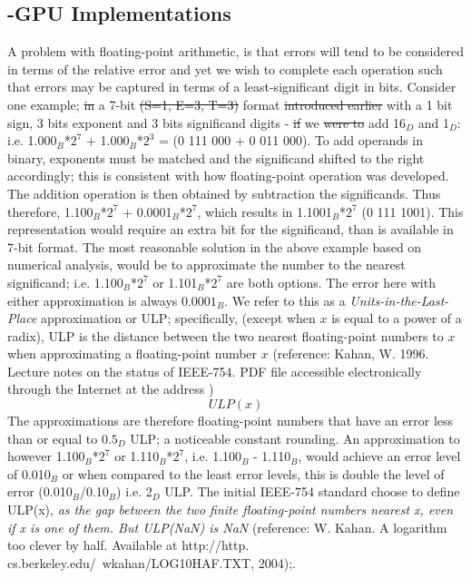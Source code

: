 \documentclass[7pt]{article}
\begin{document}
\subsection*{-GPU Implementations}
A problem with floating-point arithmetic, is that errors will tend to be considered in terms of the relative error and yet we wish to complete each operation such that errors may be captured in terms of a least-significant digit in bits. Consider one example; \st{in} a 7-bit \st{(S=1, E=3, T=3)} format \st{introduced earlier} with a 1 bit sign, 3 bits exponent  and 3 bits significand digits - 
\st{if} we \st{were to} add 16$_D$ and 1$_D$: i.e. 1.000$_B$*$2^{7}$ + 1.000$_B$*$2^{3}$ = (0 111 000 + 0 011 000). To add operands in binary, exponents must be matched and the significand shifted to the right accordingly; this is consistent with how floating-point operation was developed. The addition operation is then obtained by subtraction the significands. Thus therefore, 1.100$_B$*$2^{7}$ + 0.0001$_B$*$2^{7}$, which results in 1.1001$_B$*$2^{7}$ (0 111 1001).  This representation would require an extra bit for the significand, than is available in 7-bit format. The most reasonable solution in the above example based on numerical analysis, would be to approximate the number to the nearest significand; i.e. 1.100$_B$*$2^{7}$ or 1.101$_B$*$2^{7}$ are both options. The error here with either approximation is always $0.0001_B$. We refer to this as a \textit{Units-in-the-Last-Place} approximation or ULP; specifically, (except when $x$ is equal to a power of a radix), ULP {is the  distance between the two nearest floating-point numbers to $x$ when approximating a  floating-point number $x$} (reference: Kahan, W. 1996. Lecture notes on the status of IEEE-754. PDF file accessible electronically
through the Internet at the address %
)
$$
ULP(x)
$$
The approximations are therefore floating-point numbers that have an error less than or equal to $0.5_D$ ULP; a noticeable constant rounding. An approximation to however 1.100$_B$*$2^{7}$ or 1.110$_B$*$2^{7}$, i.e.  1.100$_B$ - 1.110$_B$, would achieve an error level of 0.010$_B$  or when compared to the least error levels, this is double the level of error (0.010$_B$/0.10$_B$) i.e. 2$_D$ ULP. The initial IEEE-754 standard choose to define ULP(x), \emph{as the gap between the two finite floating-point numbers nearest x, even if x is one of them. But ULP(NaN) is NaN} (reference: W. Kahan. A logarithm too clever by half. Available at http://http. cs.berkeley.edu/~wkahan/LOG10HAF.TXT, 2004);.
\end{document}
